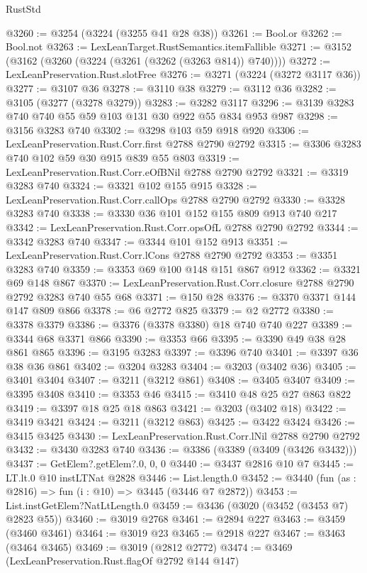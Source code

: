 \begin{lexlean}{RustStd}
\begin{coremodule}
@3260 := @3254 (@3224 (@3255 @41 @28 @38))
@3261 := Bool.or
@3262 := Bool.not
@3263 := LexLeanTarget.RustSemantics.itemFallible
@3271 := @3152 (@3162 (@3260 (@3224 (@3261 (@3262 (@3263 @814)) @740))))
@3272 := LexLeanPreservation.Rust.slotFree
@3276 := @3271 (@3224 (@3272 @3117 @36))
@3277 := @3107 @36
@3278 := @3110 @38
@3279 := @3112 @36
@3282 := @3105 (@3277 (@3278 @3279))
@3283 := @3282 @3117
@3296 := @3139 @3283 @740 @740 @55 @59 @103 @131 @30 @922 @55 @834 @953 @987
@3298 := @3156 @3283 @740
@3302 := @3298 @103 @59 @918 @920
@3306 := LexLeanPreservation.Rust.Corr.first @2788 @2790 @2792
@3315 := @3306 @3283 @740 @102 @59 @30 @915 @839 @55 @803
@3319 := LexLeanPreservation.Rust.Corr.eOfBNil @2788 @2790 @2792
@3321 := @3319 @3283 @740
@3324 := @3321 @102 @155 @915
@3328 := LexLeanPreservation.Rust.Corr.callOps @2788 @2790 @2792
@3330 := @3328 @3283 @740
@3338 := @3330 @36 @101 @152 @155 @809 @913 @740 @217
@3342 := LexLeanPreservation.Rust.Corr.opsOfL @2788 @2790 @2792
@3344 := @3342 @3283 @740
@3347 := @3344 @101 @152 @913
@3351 := LexLeanPreservation.Rust.Corr.lCons @2788 @2790 @2792
@3353 := @3351 @3283 @740
@3359 := @3353 @69 @100 @148 @151 @867 @912
@3362 := @3321 @69 @148 @867
@3370 := LexLeanPreservation.Rust.Corr.closure @2788 @2790 @2792 @3283 @740 @55 @68
@3371 := @150 @28
@3376 := @3370 @3371 @144 @147 @809 @866
@3378 := @6 @2772 @825
@3379 := @2 @2772
@3380 := @3378 @3379
@3386 := @3376 (@3378 @3380) @18 @740 @740 @227
@3389 := @3344 @68 @3371 @866
@3390 := @3353 @66
@3395 := @3390 @49 @38 @28 @861 @865
@3396 := @3195 @3283
@3397 := @3396 @740
@3401 := @3397 @36 @38 @36 @861
@3402 := @3204 @3283
@3404 := @3203 (@3402 @36)
@3405 := @3401 @3404
@3407 := @3211 (@3212 @861)
@3408 := @3405 @3407
@3409 := @3395 @3408
@3410 := @3353 @46
@3415 := @3410 @48 @25 @27 @863 @822
@3419 := @3397 @18 @25 @18 @863
@3421 := @3203 (@3402 @18)
@3422 := @3419 @3421
@3424 := @3211 (@3212 @863)
@3425 := @3422 @3424
@3426 := @3415 @3425
@3430 := LexLeanPreservation.Rust.Corr.lNil @2788 @2790 @2792
@3432 := @3430 @3283 @740
@3436 := @3386 (@3389 (@3409 (@3426 @3432)))
@3437 := GetElem?.getElem?.{0, 0, 0}
@3440 := @3437 @2816 @10 @7
@3445 := LT.lt.{0} @10 instLTNat @2828
@3446 := List.length.{0}
@3452 := @3440 (fun (as : @2816) => fun (i : @10) => @3445 (@3446 @7 @2872))
@3453 := List.instGetElem?NatLtLength.{0}
@3459 := @3436 (@3020 (@3452 (@3453 @7) @2823 @55))
@3460 := @3019 @2768
@3461 := @2894 @227
@3463 := @3459 (@3460 @3461)
@3464 := @3019 @23
@3465 := @2918 @227
@3467 := @3463 (@3464 @3465)
@3469 := @3019 (@2812 @2772)
@3474 := @3469 (LexLeanPreservation.Rust.flagOf @2792 @144 @147)

\end{coremodule}
\end{lexlean}
